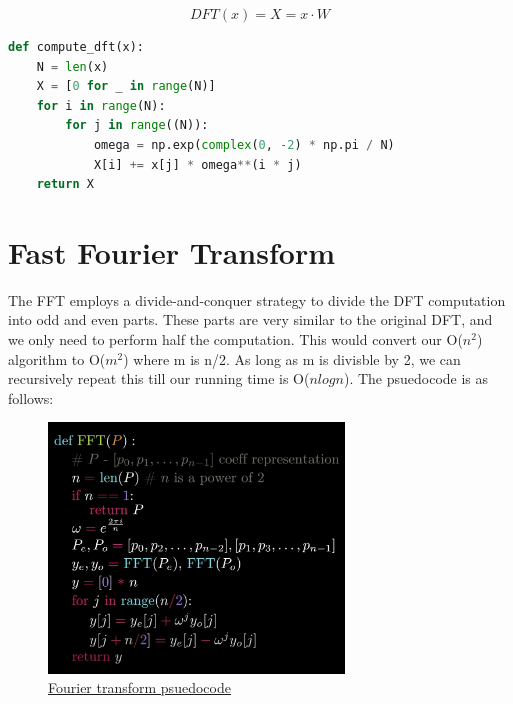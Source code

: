 \documentclass[paper=a4, fontsize=11pt]{scrartcl}
\numberwithin{equation}{section}		%
\numberwithin{figure}{section}			%
\numberwithin{table}{section}				%
\begin{document}
\vspace{5mm}

\begin{equation}   
    DFT(x) = X = x \cdot W
\end{equation}

\newpage
\begin{lstlisting}[language=python, caption= {A python program to compute DFT of a given signal}, captionpos=b]
def compute_dft(x):
    N = len(x)
    X = [0 for _ in range(N)]
    for i in range(N):
        for j in range((N)):
            omega = np.exp(complex(0, -2) * np.pi / N)
            X[i] += x[j] * omega**(i * j)
    return X
\end{lstlisting}



\section{Fast Fourier Transform}
The FFT employs a divide-and-conquer strategy to divide the DFT computation into odd and even parts. These parts are very similar to the original DFT, and we only need to perform half the computation. This would convert our O($n^2$) algorithm to O($m^2$) where m is n/2. As long as m is divisble by 2, we can recursively repeat this till our running time is O($nlogn$). The psuedocode is as follows:
\begin{center}
\begin{figure}[h]
\caption{\href{https://www.youtube.com/watch?v=h7apO7q16V0&t=1345s&ab_channel=Reducible}{Fourier transform psuedocode}}
\centering
\includegraphics[width=0.7\textwidth]{images/fft.png}
\end{figure}
\end{center}

\vspace{15mm}
\end{document}
